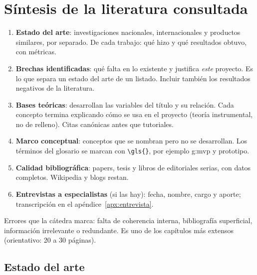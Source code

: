 
\chapter{Síntesis de la literatura consultada}\label{cap:marco-teorico}

\begin{guia}
\begin{enumerate}
    \item \textbf{Estado del arte}: investigaciones nacionales,
          internacionales y productos similares, por separado. De cada
          trabajo: qué hizo y qué resultados obtuvo, con métricas.
    \item \textbf{Brechas identificadas}: qué falta en lo existente y
          justifica \emph{este} proyecto. Es lo que separa un estado del
          arte de un listado. Incluir también los resultados negativos de
          la literatura.
    \item \textbf{Bases teóricas}: desarrollan las variables del título y su
          relación. Cada concepto termina explicando cómo se usa en el
          proyecto (teoría instrumental, no de relleno). Citas canónicas
          antes que tutoriales.
    \item \textbf{Marco conceptual}: conceptos que se nombran pero no se
          desarrollan. Los términos del glosario se marcan con
          \verb|\gls{}|, por ejemplo \gls{g:mvp} y \gls{prototipo}.
    \item \textbf{Calidad bibliográfica}: papers, tesis y libros de
          editoriales serias, con datos completos. Wikipedia y blogs restan.
    \item \textbf{Entrevistas a especialistas} (si las hay): fecha, nombre,
          cargo y aporte; transcripción en el apéndice~\ref{apx:entrevista}.
\end{enumerate}
Errores que la cátedra marca: falta de coherencia interna, bibliografía
superficial, información irrelevante o redundante. Es uno de los
capítulos más extensos (orientativo: 20 a 30 páginas).
\end{guia}

\section{Estado del arte}\label{sec:estado-del-arte}

